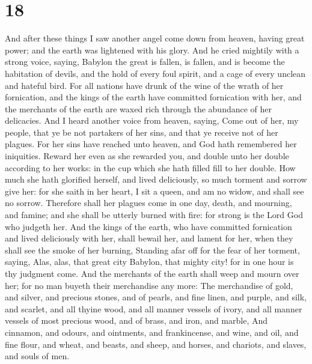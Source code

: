 \hypertarget{section-17}{%
\section{18}\label{section-17}}

 And after these things I saw another angel come down from
heaven, having great power; and the earth was lightened with his glory.
 And he cried mightily with a strong voice, saying,
Babylon the great is fallen, is fallen, and is become the habitation of
devils, and the hold of every foul spirit, and a cage of every unclean
and hateful bird.  For all nations have drunk of the wine
of the wrath of her fornication, and the kings of the earth have
committed fornication with her, and the merchants of the earth are waxed
rich through the abundance of her delicacies.  And I heard
another voice from heaven, saying, Come out of her, my people, that ye
be not partakers of her sins, and that ye receive not of her plagues.
 For her sins have reached unto heaven, and God hath
remembered her iniquities.  Reward her even as she
rewarded you, and double unto her double according to her works: in the
cup which she hath filled fill to her double.  How much
she hath glorified herself, and lived deliciously, so much torment and
sorrow give her: for she saith in her heart, I sit a queen, and am no
widow, and shall see no sorrow.  Therefore shall her
plagues come in one day, death, and mourning, and famine; and she shall
be utterly burned with fire: for strong is the Lord God who judgeth her.
 And the kings of the earth, who have committed
fornication and lived deliciously with her, shall bewail her, and lament
for her, when they shall see the smoke of her burning, 
Standing afar off for the fear of her torment, saying, Alas, alas, that
great city Babylon, that mighty city! for in one hour is thy judgment
come.  And the merchants of the earth shall weep and
mourn over her; for no man buyeth their merchandise any more:
 The merchandise of gold, and silver, and precious
stones, and of pearls, and fine linen, and purple, and silk, and
scarlet, and all thyine wood, and all manner vessels of ivory, and all
manner vessels of most precious wood, and of brass, and iron, and
marble,  And cinnamon, and odours, and ointments, and
frankincense, and wine, and oil, and fine flour, and wheat, and beasts,
and sheep, and horses, and chariots, and slaves, and souls of men.
